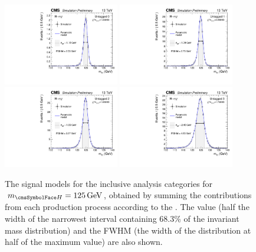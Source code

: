 \begin{figure}[ht!]
\centering
\includegraphics[width=0.45\textwidth]{modellingFigures/DCBpG/UntaggedTag_0.pdf} 
\includegraphics[width=0.45\textwidth]{modellingFigures/DCBpG/UntaggedTag_1.pdf} \\
\includegraphics[width=0.45\textwidth]{modellingFigures/DCBpG/UntaggedTag_2.pdf} 
\includegraphics[width=0.45\textwidth]{modellingFigures/DCBpG/UntaggedTag_3.pdf}  

\caption{The signal models for the inclusive analysis categories for $\mH=125\GeV$, obtained by summing the contributions from each production process according to the \effxacc. The \effSigma value (half the width of the narrowest interval containing 68.3\% of the invariant mass distribution) and the FWHM (the width of the distribution at half of the maximum value) are also shown.}

\label{fig:model:sig_model_per_category_inc}
\end{figure}
